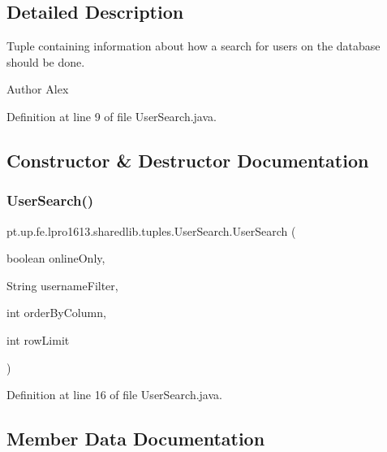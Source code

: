 \subsection{Detailed Description}
Tuple containing information about how a search for users on the database should be done.

\begin{DoxyAuthor}{Author}
Alex 
\end{DoxyAuthor}


Definition at line 9 of file User\+Search.\+java.



\subsection{Constructor \& Destructor Documentation}
\hypertarget{classpt_1_1up_1_1fe_1_1lpro1613_1_1sharedlib_1_1tuples_1_1_user_search_ae1f68b5f9c05091269fadda5bb24598e}{}\label{classpt_1_1up_1_1fe_1_1lpro1613_1_1sharedlib_1_1tuples_1_1_user_search_ae1f68b5f9c05091269fadda5bb24598e} 
\subsubsection{\texorpdfstring{User\+Search()}{UserSearch()}}
{\footnotesize\ttfamily pt.\+up.\+fe.\+lpro1613.\+sharedlib.\+tuples.\+User\+Search.\+User\+Search (\begin{DoxyParamCaption}\item[{boolean}]{online\+Only,  }\item[{String}]{username\+Filter,  }\item[{int}]{order\+By\+Column,  }\item[{int}]{row\+Limit }\end{DoxyParamCaption})}



Definition at line 16 of file User\+Search.\+java.



\subsection{Member Data Documentation}
\hypertarget{classpt_1_1up_1_1fe_1_1lpro1613_1_1sharedlib_1_1tuples_1_1_user_search_aa0add11e4d307a21e5b8fdc6b3a05b1a}{}\label{classpt_1_1up_1_1fe_1_1lpro1613_1_1sharedlib_1_1tuples_1_1_user_search_aa0add11e4d307a21e5b8fdc6b3a05b1a} 
